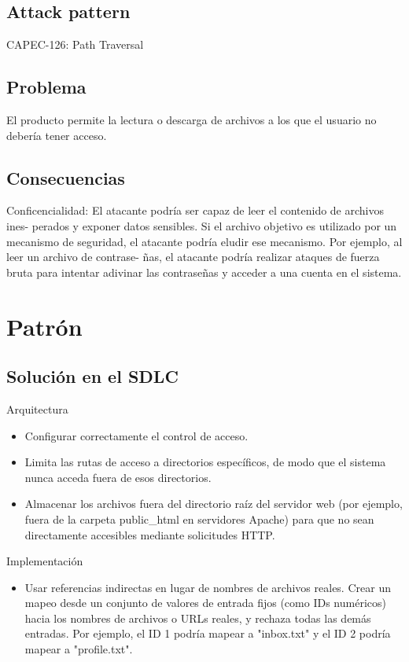 \subsection{Attack pattern}
CAPEC-126: Path Traversal
\subsection{Problema}
El producto permite la lectura o descarga de archivos a los que el usuario no debería tener acceso.
\subsection{Consecuencias}
Conficencialidad: El atacante podría ser capaz de leer el contenido de archivos ines-
perados y exponer datos sensibles. Si el archivo objetivo es utilizado por un mecanismo de
seguridad, el atacante podría eludir ese mecanismo. Por ejemplo, al leer un archivo de contrase-
ñas, el atacante podría realizar ataques de fuerza bruta para intentar adivinar las contraseñas
y acceder a una cuenta en el sistema.
\section{Patrón}
\subsection{Solución en el SDLC}

Arquitectura
\begin{itemize}
    \item Configurar correctamente el control de acceso.
    \item Limita las rutas de acceso a directorios específicos, de modo que el sistema nunca acceda fuera de esos directorios.
    \item Almacenar los archivos fuera del directorio raíz del servidor web (por ejemplo, fuera de la carpeta public\_html en servidores Apache) para que no sean directamente accesibles mediante solicitudes HTTP.
\end{itemize}

Implementación
\begin{itemize}
    \item Usar referencias indirectas en lugar de nombres de archivos reales. Crear un mapeo desde un conjunto de valores de entrada fijos (como IDs numéricos) hacia los nombres de archivos o URLs reales, y rechaza todas las demás entradas. Por ejemplo, el ID 1 podría mapear a "inbox.txt" y el ID 2 podría mapear a "profile.txt". 
\end{itemize}

